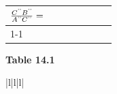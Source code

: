 {{\begin{center}
\begin{tabular}[t]{|l|l|l|}
    
        
                \begin{math}\frac{{C}^{\text{'}\text{'}}{B}^{\text{'}\text{'}}}{{A}^{\text{'}\text{'}}{C}^{\text{'}\text{'}}}=\phantom{\rule{42.67912pt}{0ex}}\end{math}
     \tabularnewline\cline{1-1}\cline{2-2}\cline{3-3}
    \end{tabular}
      \end{center}
    \begin{center}{\small\bfseries Table 14.1}\end{center}
    
    \addtocounter{footnote}{-0}
    
          }{ %
        
    
        \begin{center}
      
      \label{m39405*id78604}
      
    \noindent
      \tablelasttail{}
      \begin{xtabular}[t]{|l|l|l|}\hline
     \tabularnewline{}
    
    
        

\end{xtabular}
\end{center}}}
